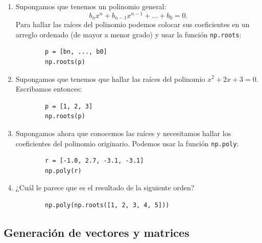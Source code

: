 \documentclass[11pt,a4paper,openany]{book}
\begin{document}
\begin{enumerate}
	\item Supongamos que tenemos un polinomio general:
	\begin{equation}
		b_{n}x^{n}+b_{n-1}x^{n-1}+...+b_{0}=0.
	\end{equation}
	Para hallar las raíces del polinomio podemos colocar sus coeficientes en un arreglo ordenado (de mayor a menor grado) y usar la función \texttt{np.roots}:
	\begin{verbatim}
		p = [bn, ..., b0]
		np.roots(p)
	\end{verbatim}
	
	\item Supongamos que tenemos que hallar las raíces del polinomio $x^{2}+2x+3=0$. Escribamos entonces:
	\begin{verbatim}
		p = [1, 2, 3]
		np.roots(p)
	\end{verbatim}
	
	\item Supongamos ahora que conocemos las raíces y necesitamos hallar los coeficientes del polinomio originario. Podemos usar la función \texttt{np.poly}:
	\begin{verbatim}
		r = [-1.0, 2.7, -3.1, -3.1]
		np.poly(r)
	\end{verbatim}
	
	\item ¿Cuál le parece que es el resultado de la siguiente orden?
	\begin{verbatim}
		np.poly(np.roots([1, 2, 3, 4, 5]))
	\end{verbatim}
	
\end{enumerate}

\subsection{Generación de vectores y matrices}
\end{document}
